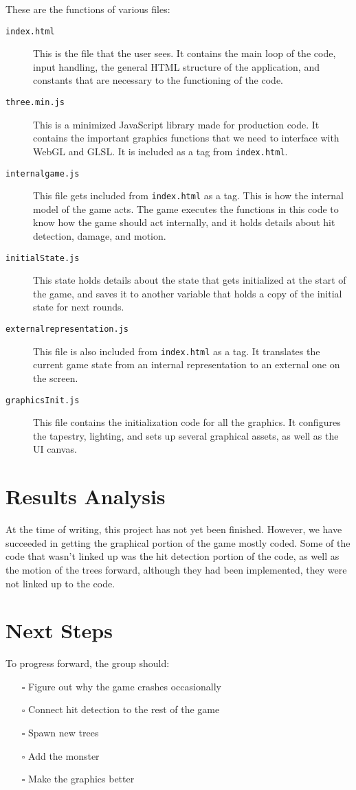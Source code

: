 \documentclass[11pt]{article}
\begin{document}
These are the functions of various files:
\begin{description}
\item[{\texttt{index.html}}] This is the file that the user sees. It contains the main loop
of the code, input handling, the general HTML structure of the application,
and constants that are necessary to the functioning of the code.
\item[{\texttt{three.min.js}}] This is a minimized JavaScript library made for production
code. It contains the important graphics functions that we need to interface
with WebGL and GLSL. It is included as a tag from \texttt{index.html}.
\item[{\texttt{internalgame.js}}] This file gets included from \texttt{index.html} as a tag.
This is how the internal model of the game acts. The game executes the
functions in this code to know how the game should act internally, and
it holds details about hit detection, damage, and motion.
\item[{\texttt{initialState.js}}] This state holds details about the state that gets
initialized at the start of the game, and saves it to another variable that
holds a copy of the initial state for next rounds.
\item[{\texttt{externalrepresentation.js}}] This file is also included from \texttt{index.html} as
a tag. It translates the current game state from an internal representation to
an external one on the screen.
\item[{\texttt{graphicsInit.js}}] This file contains the initialization code for all the
graphics. It configures the tapestry, lighting, and sets up several graphical
assets, as well as the UI canvas.
\end{description}
\section{Results Analysis}
\label{sec:org47555f2}
At the time of writing, this project has not yet been finished. However,
we have succeeded in getting the graphical portion of the game mostly
coded. Some of the code that wasn't linked up was the hit detection portion
of the code, as well as the motion of the trees forward, although they had
been implemented, they were not linked up to the code.
\section{Next Steps}
\label{sec:orgec6f158}
To progress forward, the group should:
\begin{itemize}
\item[{$\square$}] Figure out why the game crashes occasionally
\item[{$\square$}] Connect hit detection to the rest of the game
\item[{$\square$}] Spawn new trees
\item[{$\square$}] Add the monster
\item[{$\square$}] Make the graphics better
\end{itemize}
\end{document}
